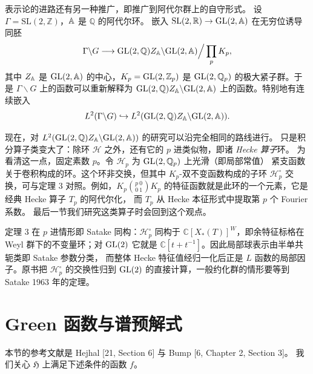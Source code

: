 表示论的进路还有另一种推广，即推广到阿代尔群上的自守形式。
设 $\Gamma=\mathrm{SL}(2,\mathbb{Z})$，$\mathbb{A}$ 是 $\mathbb{Q}$ 的阿代尔环。
嵌入 $\mathrm{SL}(2,\mathbb{R})\to\mathrm{GL}(2,\mathbb{A})$ 在无穷位诱导同胚
\[
\Gamma\backslash G\longrightarrow \mathrm{GL}(2,\mathbb{Q})Z_{\mathbb{A}}\backslash\mathrm{GL}(2,\mathbb{A})\Big/\prod_{p}K_{p},
\]
其中 $Z_{\mathbb{A}}$ 是 $\mathrm{GL}(2,\mathbb{A})$ 的中心，$K_{p}=\mathrm{GL}(2,\mathbb{Z}_{p})$ 是 $\mathrm{GL}(2,\mathbb{Q}_{p})$
的极大紧子群。于是 $\Gamma\backslash G$ 上的函数可以重新解释为
$\mathrm{GL}(2,\mathbb{Q})Z_{\mathbb{A}}\backslash\mathrm{GL}(2,\mathbb{A})$ 上的函数。特别地有连续嵌入
\[
L^{2}(\Gamma\backslash G)\hookrightarrow
L^{2}(\mathrm{GL}(2,\mathbb{Q})Z_{\mathbb{A}}\backslash\mathrm{GL}(2,\mathbb{A})).
\]

现在，对 $L^{2}(\mathrm{GL}(2,\mathbb{Q})Z_{\mathbb{A}}\backslash\mathrm{GL}(2,\mathbb{A}))$ 的研究可以沿完全相同的路线进行。
只是积分算子类变大了：除环 $\mathcal{H}$ 之外，还有它的 $p$ 进类似物，即诸 \emph{Hecke 算子}环。
为看清这一点，固定素数 $p$。令 $\mathcal{H}_{p}$ 为 $\mathrm{GL}(2,\mathbb{Q}_{p})$ 上光滑（即局部常值）
紧支函数关于卷积构成的环。这个环非交换，但其中 $K_{p}$-双不变函数构成的子环
$\mathcal{H}_{p}^{\circ}$ 交换，可与定理 3 对照。例如，$K_{p}\binom{p\ 0}{0\ 1}K_{p}$
的特征函数就是此环的一个元素，它是经典 Hecke 算子 $T_{p}$ 的阿代尔化，
而 $T_{p}$ 从 Hecke 本征形式中提取第 $p$ 个 Fourier 系数。
最后一节我们研究这类算子时会回到这个观点。

\begin{annote}
定理 3 在 $p$ 进情形即 Satake 同构：$\mathcal{H}_{p}^{\circ}$ 同构于
$\mathbb{C}[X_{*}(T)]^{W}$，即余特征标格在 Weyl 群下的不变量环；对 $\mathrm{GL}(2)$ 它就是
$\mathbb{C}[t+t^{-1}]$。因此局部球表示由半单共轭类即 Satake 参数分类，
而整体 Hecke 特征值经归一化后正是 $L$ 函数的局部因子。原书把 $\mathcal{H}_{p}^{\circ}$
的交换性归到 $\mathrm{GL}(2)$ 的直接计算，一般约化群的情形要等到 Satake 1963 年的定理。
\par{}
\end{annote}

\section{Green 函数与谱预解式}

本节的参考文献是 Hejhal [21, Section 6] 与 Bump [6, Chapter 2, Section 3]。
我们关心 $\mathfrak{H}$ 上满足下述条件的函数 $f$。


